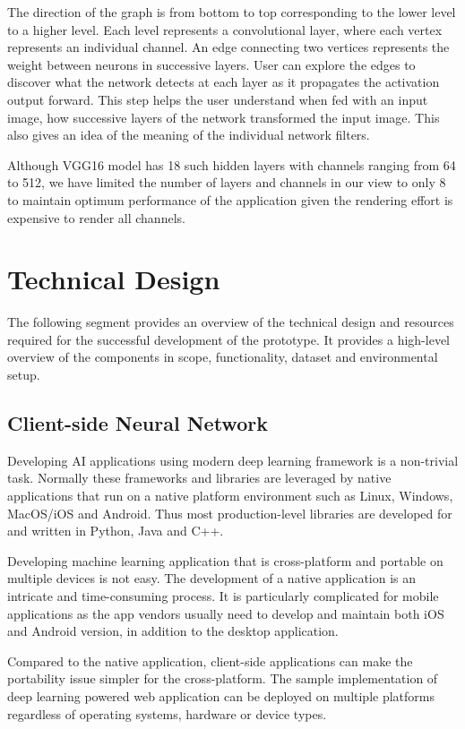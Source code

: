 The direction of the graph is from bottom to top corresponding to the lower level to a higher level. Each level represents a convolutional layer, where each vertex represents an individual channel. An edge connecting two vertices represents the weight between neurons in successive layers. User can explore the edges to discover what the network detects at each layer as it propagates the activation output forward. This step helps the user understand when fed with an input image, how successive layers of the network transformed the input image. This also gives an idea of the meaning of the individual network filters.

Although VGG16 model has 18 such hidden layers with channels ranging from 64 to 512, we have limited the number of layers and channels in our view to only 8 to maintain optimum performance of the application given the rendering effort is expensive to render all channels.

\section{Technical Design}
The following segment provides an overview of the technical design and resources required for the successful development of the prototype. It provides a high-level overview of the components in scope, functionality, dataset and environmental setup.

\subsection{Client-side Neural Network}
Developing AI applications using modern deep learning framework is a non-trivial task. Normally these frameworks and libraries are leveraged by native applications that run on a native platform environment such as Linux, Windows, MacOS/iOS and Android. Thus most production-level libraries are developed for and written in Python, Java and C++.

Developing machine learning application that is cross-platform and portable on multiple devices is not easy. The development of a native application is an intricate and time-consuming process. It is particularly complicated for mobile applications as the app vendors usually need to develop and maintain both iOS and Android version, in addition to the desktop application.

Compared to the native application, client-side applications can make the portability issue simpler for the cross-platform. The sample implementation of deep learning powered web application can be deployed on multiple platforms regardless of operating systems, hardware or device types.

